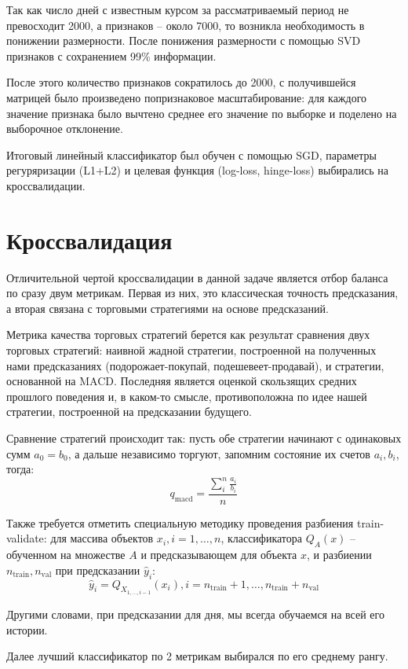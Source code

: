 \documentclass[pdftex,ptm,12pt,a4paper]{report}
\begin{document}
Так как число дней с известным курсом за рассматриваемый период не превосходит 2000, а признаков -- около 7000, то возникла
необходимость в понижении размерности. После понижения размерности с помощью SVD\cite{svd} признаков с сохранением
99\% информации.

После этого количество признаков сократилось до 2000, с получившейся матрицей было произведено попризнаковое
масштабирование: для каждого значение признака было вычтено среднее его значение по выборке и поделено на выборочное отклонение.

Итоговый линейный классификатор был обучен с помощью SGD\cite{sgd}, параметры регуряризации (L1+L2) и целевая функция (log-loss, hinge-loss) выбирались на кроссвалидации.

\section{Кроссвалидация}

Отличительной чертой кроссвалидации в данной задаче является отбор баланса по сразу двум метрикам. Первая из них, это
классическая точность предсказания, а вторая связана с торговыми стратегиями на основе предсказаний. 

Метрика качества торговых стратегий берется как результат сравнения двух торговых стратегий: наивной жадной стратегии, построенной на полученных нами предсказаниях (подорожает-покупай, подешевеет-продавай), и стратегии, основанной на MACD\cite{macd}. Последняя является оценкой скользящих средних прошлого поведения и, в каком-то смысле, противоположна по идее нашей стратегии,
построенной на предсказании будущего.

Сравнение стратегий происходит так: пусть обе стратегии начинают с одинаковых сумм $a_0 = b_0$, а дальше независимо
торгуют, запомним состояние их счетов $a_i, b_i$, тогда:
\[ q_\text{macd} = \frac{\sum_i^n \frac{a_i}{b_i}}{n} \]

Также требуется отметить специальную методику проведения разбиения train-validate: для массива объектов $x_i, i=1,\ldots,n$, классификатора $Q_A(x)$ -- обученном на множестве $A$ и предсказывающем для объекта $x$, 
и разбиении $n_\text{train}, n_\text{val}$ при предсказании $\hat{y}_i$:
\[ \hat{y}_i = Q_{X_{1,\ldots,i-1}}(x_i), i=n_\text{train}+1,\ldots,n_\text{train} + n_\text{val} \]

Другими словами, при предсказании для дня, мы всегда обучаемся на всей его истории.

Далее лучший классификатор по 2 метрикам выбирался по его среднему рангу.
\end{document}
